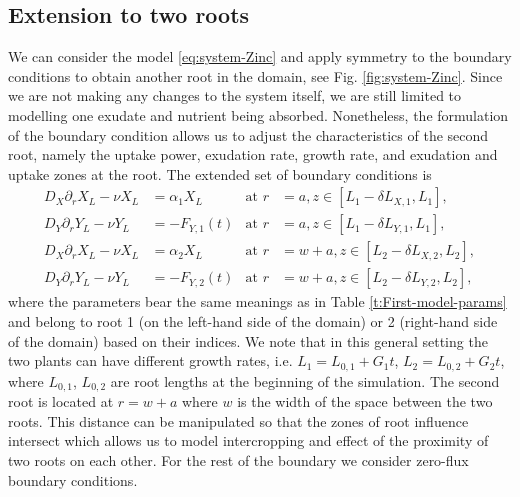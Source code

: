 \documentclass[11pt]{article}
\numberwithin{equation}{section}
\begin{document}
\subsection{Extension to two roots}
We can consider the model \eqref{eq:system-Zinc} and apply symmetry to the boundary conditions to obtain another root in the domain, see Fig. \ref{fig:system-Zinc}. Since we are not making any changes to the system itself, we are still limited to modelling one exudate and nutrient being absorbed. Nonetheless, the formulation of the boundary condition allows us to adjust the characteristics of the second root, namely the uptake power, exudation rate, growth rate, and exudation and uptake zones at the root. The extended set of boundary conditions is
\begin{subequations}
\begin{align}
    D_X \partial_r X_L - \nu X_L &= \alpha_1 X_L & \text{at } r &= a, z \in [L_1 - \delta L_{X,1}, L_1], \\
    D_Y \partial_r Y_L - \nu Y_L &= -F_{Y,1}(t) &\text{at } r &= a, z \in [L_1 - \delta L_{Y,1}, L_1], \\
    D_X \partial_r X_L - \nu X_L &= \alpha_2 X_L & \text{at } r &= w+a, z \in [L_2 - \delta L_{X,2}, L_2], \\
    D_Y \partial_r Y_L - \nu Y_L &= -F_{Y,2}(t) &\text{at } r &= w+a, z \in [L_2 - \delta L_{Y,2}, L_2],
\end{align}
\end{subequations}
where the parameters bear the same meanings as in Table \ref{t:First-model-params} and belong to root 1 (on the left-hand side of the domain) or 2 (right-hand side of the domain) based on their indices. We note that in this general setting the two plants can have different growth rates, i.e. $L_1 = L_{0,1} + G_1t$, $L_2 = L_{0,2} + G_2t$, where $L_{0,1}$, $L_{0,2}$ are root lengths at the beginning of the simulation. The second root is located at $r = w+a$ where $w$ is the width of the space between the two roots. This distance can be manipulated so that the zones of root influence intersect which allows us to model intercropping and effect of the proximity of two roots on each other. For the rest of the boundary we consider zero-flux boundary conditions.
\end{document}
